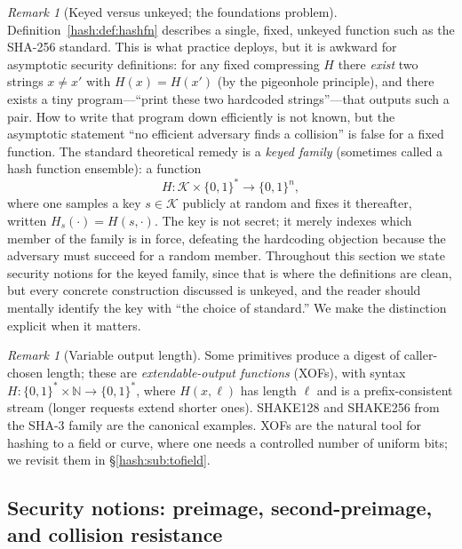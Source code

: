 \documentclass[11pt,a4paper]{article}
\theoremstyle{definition}
\theoremstyle{remark}
\newtheorem{remark}[theorem]{Remark}
\newcommand{\N}{\ensuremath{\mathbb{N}}}
\begin{document}
\begin{remark}[Keyed versus unkeyed; the foundations problem]\label{hash:rem:keyed}
Definition~\ref{hash:def:hashfn} describes a single, fixed, unkeyed function such as the SHA-256 standard. This is what practice deploys, but it is awkward for asymptotic security definitions: for any fixed compressing \(H\) there \emph{exist} two strings \(x \neq x'\) with \(H(x) = H(x')\) (by the pigeonhole principle), and there exists a tiny program---``print these two hardcoded strings''---that outputs such a pair. How to write that program down efficiently is not known, but the asymptotic statement ``no efficient adversary finds a collision'' is false for a fixed function. The standard theoretical remedy is a \emph{keyed family} (sometimes called a hash function ensemble): a function
\[
  H \colon \mathcal{K} \times \{0,1\}^{*} \longrightarrow \{0,1\}^{n},
\]
where one samples a key \(s \in \mathcal{K}\) publicly at random and fixes it thereafter, written \(H_{s}(\cdot) = H(s,\cdot)\). The key is not secret; it merely indexes which member of the family is in force, defeating the hardcoding objection because the adversary must succeed for a random member. Throughout this section we state security notions for the keyed family, since that is where the definitions are clean, but every concrete construction discussed is unkeyed, and the reader should mentally identify the key with ``the choice of standard.'' We make the distinction explicit when it matters.
\end{remark}

\begin{remark}[Variable output length]\label{hash:rem:xof}
Some primitives produce a digest of caller-chosen length; these are \emph{extendable-output functions} (XOFs), with syntax \(H \colon \{0,1\}^{*} \times \N \to \{0,1\}^{*}\), where \(H(x,\ell)\) has length \(\ell\) and is a prefix-consistent stream (longer requests extend shorter ones). SHAKE128 and SHAKE256 from the SHA-3 family are the canonical examples. XOFs are the natural tool for hashing to a field or curve, where one needs a controlled number of uniform bits; we revisit them in \S\ref{hash:sub:tofield}.
\end{remark}
\subsection{Security notions: preimage, second-preimage, and collision resistance}\label{hash:sub:security}
\end{document}
